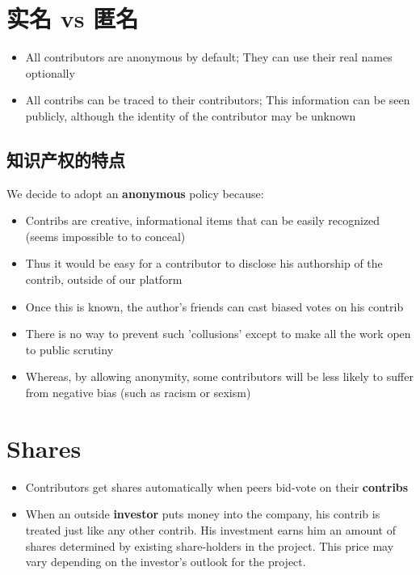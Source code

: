 \documentclass[12pt, orivec]{article}
\newcommand{\cc}[2]{#1}
\newcommand{\cc}[2]{#2}
\begin{document}
\secttoc
\section{\cc{实名 vs 匿名}{Real-name vs anonymity}}

\begin{itemize}
	\item All contributors are anonymous by default;  They can use their real names optionally
	
	\item All contribs can be traced to their contributors;  This information can be seen publicly, although the identity of the contributor may be unknown
\end{itemize}

\secttoc
\subsection{\cc{知识产权的特点}{Uniqueness of intellectual properties}}

We decide to adopt an \textbf{anonymous} policy because:
\begin{itemize}
	\item Contribs are creative, informational items that can be easily recognized (seems impossible to to conceal)
	\item Thus it would be easy for a contributor to disclose his authorship of the contrib, outside of our platform
	\item Once this is known, the author's friends can cast biased votes on his contrib
	\item There is no way to prevent such 'collusions' except to make all the work open to public scrutiny
	\item Whereas, by allowing anonymity, some contributors will be less likely to suffer from negative bias (such as racism or sexism)
\end{itemize}

\secttoc
\section{Shares}

\begin{itemize}
	\item Contributors get shares automatically when peers bid-vote on their \textbf{contribs}
	
	\item When an outside \textbf{investor} puts money into the company, his contrib is treated just like any other contrib.  His investment earns him an amount of shares determined by existing share-holders in the project.  This price may vary depending on the investor's outlook for the project.	
\end{itemize}
\end{document}
